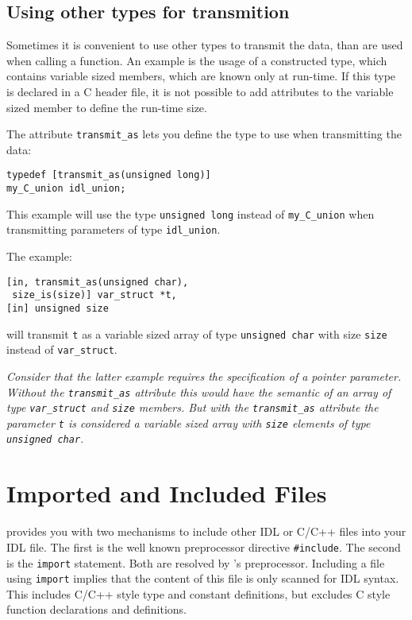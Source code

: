 
\subsection{Using other types for transmition}

Sometimes it is convenient to use other types to transmit the data, than are
used when calling a function. An example is the usage of a constructed type,
which contains variable sized members, which are known only at run-time. If
this type is declared in a C header file, it is not possible to add attributes
to the variable sized member to define the run-time size. 

The attribute \verb|transmit_as| lets you define the type to use
when transmitting the data:
\begin{verbatim}
typedef [transmit_as(unsigned long)] 
my_C_union idl_union;
\end{verbatim}
This example will use the type \verb|unsigned long| instead of
\verb|my_C_union| when transmitting parameters of type \verb|idl_union|.

The example:
\begin{verbatim}
[in, transmit_as(unsigned char),
 size_is(size)] var_struct *t,
[in] unsigned size
\end{verbatim}
will transmit \verb|t| as a variable sized array of type \verb|unsigned char|
with size \verb|size| instead of \verb|var_struct|.

{\em Consider that the latter example requires the specification of a pointer
parameter. Without the \verb|transmit_as| attribute this would have the
semantic of an array of type \verb|var_struct| and \verb|size| members. But
with the \verb|transmit_as| attribute the parameter \verb|t| is considered a
variable sized array with \verb|size| elements of type \verb|unsigned char|.}

\section{Imported and Included Files}
\label{sec:import}

\dice{} provides you with two mechanisms to include other IDL or C/C++ files
into your IDL file. The first is the well known preprocessor directive
\verb|#include|. The second is the \verb|import| statement. Both are resolved
by \dice{}'s preprocessor.  Including a file using \verb|import| implies that
the content of this file is only scanned for IDL syntax. This includes C/C++
style type and constant definitions, but excludes C style function
declarations and definitions.

